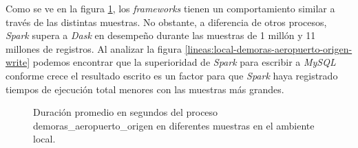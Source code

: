 Como se ve en la figura \ref{lineas:local-demoras-aeropuerto-origen}, los \textit{frameworks} tienen un comportamiento similar a través de las distintas muestras. No obstante, a diferencia de otros procesos, \textit{Spark} supera a \textit{Dask} en desempeño durante las muestras de 1 millón y 11 millones de registros. Al analizar la figura \ref{lineas:local-demoras-aeropuerto-origen-write} podemos encontrar que la superioridad de \textit{Spark} para escribir a \textit{MySQL} conforme crece el resultado escrito es un factor para que \textit{Spark} haya registrado tiempos de ejecución total menores con las muestras más grandes. 

\begin{figure}
\centering
{}
\caption{Duración promedio en segundos del proceso demoras\_aeropuerto\_origen en diferentes muestras en el ambiente local.}
\label{lineas:local-demoras-aeropuerto-origen}
\end{figure}

